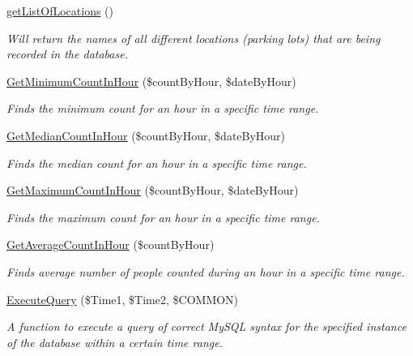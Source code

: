 \begin{DoxyCompactItemize}
\hyperlink{interface_p_h_pto_s_q_l_interface_a64377368eb86a5a874483663c7da1407}{get\+List\+Of\+Locations} ()
\begin{DoxyCompactList}\small\item\em Will return the names of all different locations (parking lots) that are being recorded in the database. \end{DoxyCompactList}\item 
\hyperlink{interface_p_h_pto_s_q_l_interface_acc7b884d5cfc62ca661996820eebbba2}{Get\+Minimum\+Count\+In\+Hour} (\$count\+By\+Hour, \$date\+By\+Hour)
\begin{DoxyCompactList}\small\item\em Finds the minimum count for an hour in a specific time range. \end{DoxyCompactList}\item 
\hyperlink{interface_p_h_pto_s_q_l_interface_a59876f14f59f0b3321ae144eb0987692}{Get\+Median\+Count\+In\+Hour} (\$count\+By\+Hour, \$date\+By\+Hour)
\begin{DoxyCompactList}\small\item\em Finds the median count for an hour in a specific time range. \end{DoxyCompactList}\item 
\hyperlink{interface_p_h_pto_s_q_l_interface_ab4dfd011e2c8436c0284c99573d30d4a}{Get\+Maximum\+Count\+In\+Hour} (\$count\+By\+Hour, \$date\+By\+Hour)
\begin{DoxyCompactList}\small\item\em Finds the maximum count for an hour in a specific time range. \end{DoxyCompactList}\item 
\hyperlink{interface_p_h_pto_s_q_l_interface_a085d2dda8ee0aa89eba99f4b475851d1}{Get\+Average\+Count\+In\+Hour} (\$count\+By\+Hour)
\begin{DoxyCompactList}\small\item\em Finds average number of people counted during an hour in a specific time range. \end{DoxyCompactList}\item 
\hyperlink{interface_p_h_pto_s_q_l_interface_ac5a84f4e20620ec0cfac496528ce01ec}{Execute\+Query} (\$Time1, \$Time2, \$C\+O\+M\+M\+ON)
\begin{DoxyCompactList}\small\item\em A function to execute a query of correct My\+S\+QL syntax for the specified instance of the database within a certain time range. \end{DoxyCompactList}\item 

\end{DoxyCompactItemize}
